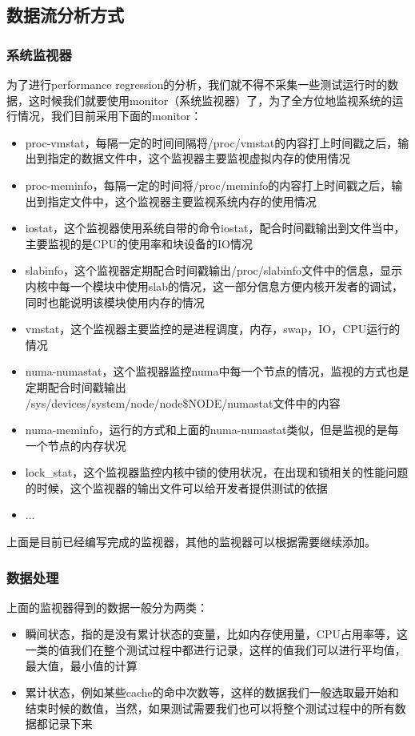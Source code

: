 \documentclass[CJK,12pt]{article}
\begin{document}
\subsection{数据流分析方式}

\subsubsection{系统监视器}
为了进行performance regression的分析，我们就不得不采集一些测试运行时的数据，这时候我们就要使用monitor（系统监视器）了，为了全方位地监视系统的运行情况，我们目前采用下面的monitor：

\begin{itemize}
\item proc-vmstat，每隔一定的时间间隔将/proc/vmstat的内容打上时间戳之后，输出到指定的数据文件中，这个监视器主要监视虚拟内存的使用情况
\item proc-meminfo，每隔一定的时间将/proc/meminfo的内容打上时间戳之后，输出到指定文件中，这个监视器主要监视系统内存的使用情况
\item iostat，这个监视器使用系统自带的命令iostat，配合时间戳输出到文件当中，主要监视的是CPU的使用率和块设备的IO情况
\item slabinfo，这个监视器定期配合时间戳输出/proc/slabinfo文件中的信息，显示内核中每一个模块中使用slab的情况，这一部分信息方便内核开发者的调试，同时也能说明该模块使用内存的情况
\item vmstat，这个监视器主要监控的是进程调度，内存，swap，IO，CPU运行的情况
\item numa-numastat，这个监视器监控numa中每一个节点的情况，监视的方式也是定期配合时间戳输出\\/sys/devices/system/node/node\$NODE/numastat文件中的内容
\item numa-meminfo，运行的方式和上面的numa-numastat类似，但是监视的是每一个节点的内存状况
\item lock\_stat，这个监视器监控内核中锁的使用状况，在出现和锁相关的性能问题的时候，这个监视器的输出文件可以给开发者提供测试的依据
\item ...
\end{itemize}
上面是目前已经编写完成的监视器，其他的监视器可以根据需要继续添加。

\subsubsection{数据处理}

上面的监视器得到的数据一般分为两类：
\begin{itemize}
\item 瞬间状态，指的是没有累计状态的变量，比如内存使用量，CPU占用率等，这一类的值我们在整个测试过程中都进行记录，这样的值我们可以进行平均值，最大值，最小值的计算
\item 累计状态，例如某些cache的命中次数等，这样的数据我们一般选取最开始和结束时候的数值，当然，如果测试需要我们也可以将整个测试过程中的所有数据都记录下来
\end{itemize}
\end{document}
